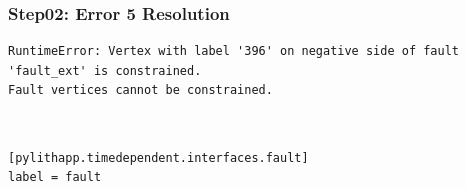 \documentclass{beamer}
\begin{document}
\begin{frame}[fragile]
  \frametitle{Step02: Error 5 Resolution}

\begin{lstlisting}
RuntimeError: Vertex with label '396' on negative side of fault 'fault_ext' is constrained.
Fault vertices cannot be constrained.
\end{lstlisting}\pause
{} \pause\\
\begin{lstlisting}
[pylithapp.timedependent.interfaces.fault]
label = fault
\end{lstlisting}

\end{frame}
\end{document}
